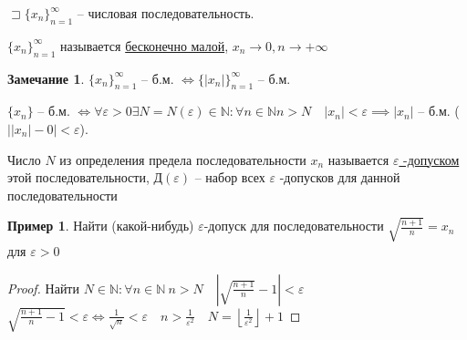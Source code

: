 \documentclass{book}
\newcommand\N{\ensuremath{\mathbb{N}}}
\theoremstyle{definition}
\newtheorem*{note}{Замечание}
\newtheorem*{example}{Пример}
\begin{document}
    \begin{definition}
        $\sqsupset \{x_n\}_{n=1}^{\infty }$ -- числовая последовательность. 

        $\{x_n\}_{n=1}^{\infty }$ называется \underline{бесконечно малой}, $x_{n} \to 0, n\to +\infty $
    \end{definition}
    
    \begin{note}
        $\{x_n\}_{n=1}^{\infty }$ -- б.м. $\iff \{\left| x_{n}  \right| \}_{n=1}^{\infty }$ -- б.м.

        $\{x_n\}$ -- б.м. $\iff  \forall \varepsilon>0 \exists N = N(\varepsilon)\in \N: \forall n\in \N  n>N\quad \left| x_n \right| <\varepsilon \implies \left| x_n \right|  $ -- б.м. ($\left| \left| x_{n}  \right| -0 \right| <\varepsilon$).
    \end{note}

    \begin{definition}
        Число $N$ из определения предела последовательности $x_{n} $ называется \underline{$\varepsilon$ -допуском} этой последовательности, Д$\left( \varepsilon \right) $ -- набор всех $\varepsilon$ -допусков для данной последовательности
    \end{definition}

    \begin{example}
        Найти (какой-нибудь) $\varepsilon$-допуск для последовательности $\sqrt{\frac{n+1}{n}} = x_{n}  $ для $\varepsilon>0$
    \end{example}
    \begin{proof}
        Найти $N\in \N :\forall n\in \N ~n>N\quad \left| \sqrt{\frac{n+1}{n}} -1 \right| <\varepsilon$\\ 
        $\sqrt{\frac{n+1}{n}-1} <\varepsilon \iff  \frac{1}{\sqrt{n} }<\varepsilon\quad n>\frac{1}{\varepsilon^2}\quad N = \left\lfloor \frac{1}{\varepsilon^2} \right\rfloor +1$
    \end{proof}
\end{document}
